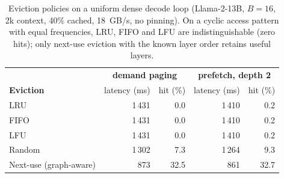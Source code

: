 \begin{table}[t]
\centering
\caption{Eviction policies on a uniform dense decode loop (Llama-2-13B, $B{=}16$, 2k context, 40\% cached, 18~GB/s, no pinning). On a cyclic access pattern with equal frequencies, LRU, FIFO and LFU are indistinguishable (zero hits); only next-use eviction with the known layer order retains useful layers.}
\label{tab:evict}
\small
\begin{tabular}{lrrrr}
\toprule
 & \multicolumn{2}{c}{\textbf{demand paging}} & \multicolumn{2}{c}{\textbf{prefetch, depth 2}}\\
\textbf{Eviction} & latency (ms) & hit (\%) & latency (ms) & hit (\%)\\
\midrule
LRU & 1\,431 & 0.0 & 1\,410 & 0.2\\
FIFO & 1\,431 & 0.0 & 1\,410 & 0.2\\
LFU & 1\,431 & 0.0 & 1\,410 & 0.2\\
Random & 1\,302 & 7.3 & 1\,264 & 9.3\\
Next-use (graph-aware) & 873 & 32.5 & 861 & 32.7\\
\bottomrule
\end{tabular}
\end{table}
